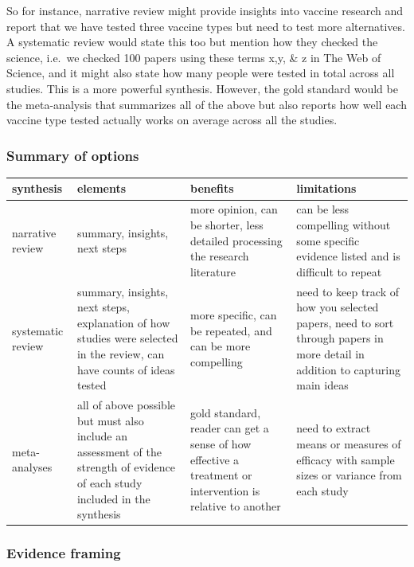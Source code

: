 \documentclass[
]{book}
\begin{document}
So for instance, narrative review might provide insights into vaccine research and report that we have tested three vaccine types but need to test more alternatives. A systematic review would state this too but mention how they checked the science, i.e.~we checked 100 papers using these terms x,y, \& z in The Web of Science, and it might also state how many people were tested in total across all studies. This is a more powerful synthesis. However, the gold standard would be the meta-analysis that summarizes all of the above but also reports how well each vaccine type tested actually works on average across all the studies.

\hypertarget{summary-of-options}{%
\subsubsection*{Summary of options}\label{summary-of-options}}

\begin{tabular}{llll}
\toprule
synthesis & elements & benefits & limitations\\
\midrule
narrative review & summary, insights, next steps & more opinion, can be shorter, less detailed processing the research literature & can be less compelling without some specific evidence listed and is difficult to repeat\\
systematic review & summary, insights, next steps, explanation of how studies were selected in the review, can have counts of ideas tested & more specific, can be repeated, and can be more compelling & need to keep track of how you selected papers, need to sort through papers in more detail in addition to capturing main ideas\\
meta-analyses & all of above possible but must also include an assessment of the strength of evidence of each study included in the synthesis & gold standard, reader can get a sense of how effective a treatment or intervention is relative to another & need to extract means or measures of efficacy with sample sizes or variance from each study\\
\bottomrule
\end{tabular}

\hypertarget{evidence-framing}{%
\subsubsection*{Evidence framing}\label{evidence-framing}}
\end{document}
